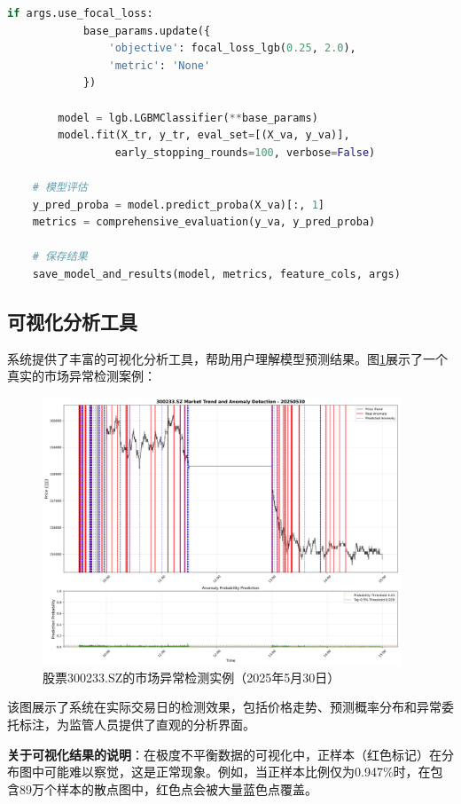 \documentclass[12pt,a4paper]{article}
\begin{document}
\begin{lstlisting}[language=Python, caption=主训练脚本关键代码]
        if args.use_focal_loss:
            base_params.update({
                'objective': focal_loss_lgb(0.25, 2.0),
                'metric': 'None'
            })
        
        model = lgb.LGBMClassifier(**base_params)
        model.fit(X_tr, y_tr, eval_set=[(X_va, y_va)], 
                 early_stopping_rounds=100, verbose=False)
    
    # 模型评估
    y_pred_proba = model.predict_proba(X_va)[:, 1]
    metrics = comprehensive_evaluation(y_va, y_pred_proba)
    
    # 保存结果
    save_model_and_results(model, metrics, feature_cols, args)
\end{lstlisting}

\subsection{可视化分析工具}

系统提供了丰富的可视化分析工具，帮助用户理解模型预测结果。图\ref{fig:market_anomaly_example}展示了一个真实的市场异常检测案例：

\begin{figure}[H]
\centering
\includegraphics[width=0.95\textwidth]{market_anomaly_example.png}
\caption{股票300233.SZ的市场异常检测实例（2025年5月30日）}
\label{fig:market_anomaly_example}
\end{figure}

该图展示了系统在实际交易日的检测效果，包括价格走势、预测概率分布和异常委托标注，为监管人员提供了直观的分析界面。

\textbf{关于可视化结果的说明}：在极度不平衡数据的可视化中，正样本（红色标记）在分布图中可能难以察觉，这是正常现象。例如，当正样本比例仅为0.947\%时，在包含89万个样本的散点图中，红色点会被大量蓝色点覆盖。
\end{document}

